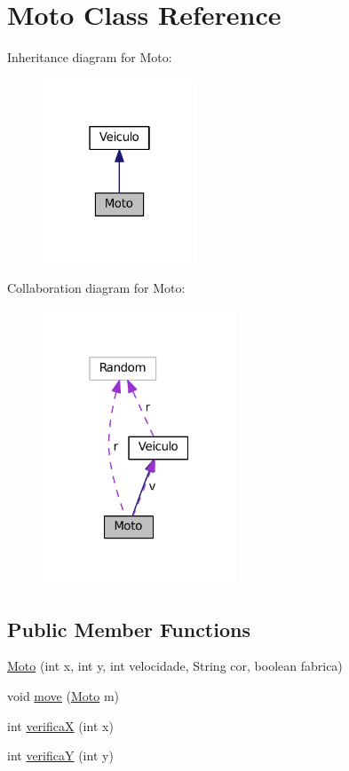 \hypertarget{classMoto}{}\section{Moto Class Reference}
\label{classMoto}


Inheritance diagram for Moto\+:\nopagebreak
\begin{figure}[H]
\begin{center}
\leavevmode
\includegraphics[width=130pt]{classMoto__inherit__graph}
\end{center}
\end{figure}


Collaboration diagram for Moto\+:\nopagebreak
\begin{figure}[H]
\begin{center}
\leavevmode
\includegraphics[width=163pt]{classMoto__coll__graph}
\end{center}
\end{figure}
\subsection*{Public Member Functions}
\begin{DoxyCompactItemize}
\item 
\hyperlink{classMoto_a676b8823dfda966d8a40d6624c5169b6}{Moto} (int x, int y, int velocidade, String cor, boolean fabrica)
\item 
void \hyperlink{classMoto_a161a14fdc1ead9e078b37537a61bc199}{move} (\hyperlink{classMoto}{Moto} m)
\item 
int \hyperlink{classMoto_a56bf604e45484d316f4a472254370289}{verificaX} (int x)
\item 
int \hyperlink{classMoto_a6933149c85bd01bad40a0e4e0052a430}{verificaY} (int y)
\end{DoxyCompactItemize}


